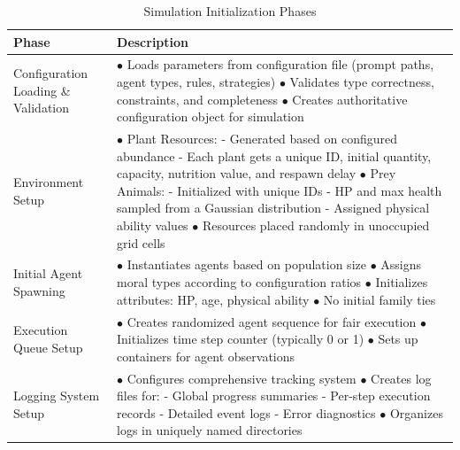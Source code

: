 \begin{table}[htbp]
  \centering
  \caption{Simulation Initialization Phases}
  \label{tab:init_phases}
  \small
  \setlength{\tabcolsep}{5pt}
  \begin{tabular}{p{3cm}p{10cm}}
    \toprule
    \textbf{Phase} & \textbf{Description} \\
    \midrule
    Configuration Loading \& Validation & 
    $\bullet$ Loads parameters from configuration file (prompt paths, agent types, rules, strategies) \newline
    $\bullet$ Validates type correctness, constraints, and completeness \newline
    $\bullet$ Creates authoritative configuration object for simulation \\
    \midrule
    Environment Setup & 
    $\bullet$ Plant Resources: \newline
    \quad - Generated based on configured abundance \newline
    \quad - Each plant gets a unique ID, initial quantity, capacity, nutrition value, and respawn delay \newline
    $\bullet$ Prey Animals: \newline
    \quad - Initialized with unique IDs \newline
    \quad - HP and max health sampled from a Gaussian distribution \newline
    \quad - Assigned physical ability values \newline
    $\bullet$ Resources placed randomly in unoccupied grid cells \\
    \midrule
    Initial Agent Spawning & 
    $\bullet$ Instantiates agents based on population size \newline
    $\bullet$ Assigns moral types according to configuration ratios \newline
    $\bullet$ Initializes attributes: HP, age, physical ability \newline
    $\bullet$ No initial family ties \\
    \midrule
    Execution Queue Setup & 
    $\bullet$ Creates randomized agent sequence for fair execution \newline
    $\bullet$ Initializes time step counter (typically 0 or 1) \newline
    $\bullet$ Sets up containers for agent observations \\
    \midrule
    Logging System Setup & 
    $\bullet$ Configures comprehensive tracking system \newline
    $\bullet$ Creates log files for: \newline
    \quad - Global progress summaries \newline
    \quad - Per-step execution records \newline
    \quad - Detailed event logs \newline
    \quad - Error diagnostics \newline
    $\bullet$ Organizes logs in uniquely named directories \\
    \bottomrule
  \end{tabular}
\end{table}
